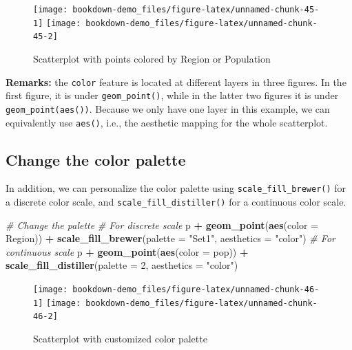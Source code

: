 \documentclass[]{book}
\newenvironment{Shaded}{\begin{snugshade}}{\end{snugshade}}
\newcommand{\KeywordTok}[1]{\textcolor[rgb]{0.13,0.29,0.53}{\textbf{#1}}}
\newcommand{\DataTypeTok}[1]{\textcolor[rgb]{0.13,0.29,0.53}{#1}}
\newcommand{\DecValTok}[1]{\textcolor[rgb]{0.00,0.00,0.81}{#1}}
\newcommand{\StringTok}[1]{\textcolor[rgb]{0.31,0.60,0.02}{#1}}
\newcommand{\CommentTok}[1]{\textcolor[rgb]{0.56,0.35,0.01}{\textit{#1}}}
\newcommand{\OperatorTok}[1]{\textcolor[rgb]{0.81,0.36,0.00}{\textbf{#1}}}
\newcommand{\NormalTok}[1]{#1}
\begin{document}
\begin{figure}
\texttt{[image: bookdown-demo\_files/figure-latex/unnamed-chunk-45-1]} \texttt{[image: bookdown-demo\_files/figure-latex/unnamed-chunk-45-2]} \caption{Scatterplot with points colored by Region or Population}\label{fig:unnamed-chunk-45}
\end{figure}

\textbf{Remarks:} the \texttt{color} feature is located at different
layers in three figures. In the first figure, it is under
\texttt{geom\_point()}, while in the latter two figures it is under
\texttt{geom\_point(aes())}. Because we only have one layer in this
example, we can equivalently use \texttt{aes()}, i.e., the aesthetic
mapping for the whole scatterplot.

\subsection{Change the color palette}\label{change-the-color-palette}

In addition, we can personalize the color palette using
\texttt{scale\_fill\_brewer()} for a discrete color scale, and
\texttt{scale\_fill\_distiller()} for a continuous color scale.

\begin{Shaded}
\begin{Highlighting}[]
\CommentTok{# Change the palette}
\CommentTok{# For discrete scale}
\NormalTok{p }\OperatorTok{+}\StringTok{ }\KeywordTok{geom_point}\NormalTok{(}\KeywordTok{aes}\NormalTok{(}\DataTypeTok{color =}\NormalTok{ Region)) }\OperatorTok{+}\StringTok{ }
\StringTok{   }\KeywordTok{scale_fill_brewer}\NormalTok{(}\DataTypeTok{palette =} \StringTok{"Set1"}\NormalTok{, }\DataTypeTok{aesthetics =} \StringTok{"color"}\NormalTok{)}
\CommentTok{# For continuous scale}
\NormalTok{p }\OperatorTok{+}\StringTok{ }\KeywordTok{geom_point}\NormalTok{(}\KeywordTok{aes}\NormalTok{(}\DataTypeTok{color =}\NormalTok{ pop)) }\OperatorTok{+}
\StringTok{ }\KeywordTok{scale_fill_distiller}\NormalTok{(}\DataTypeTok{palette =} \DecValTok{2}\NormalTok{, }\DataTypeTok{aesthetics =} \StringTok{"color"}\NormalTok{)}
\end{Highlighting}
\end{Shaded}

\begin{figure}
\texttt{[image: bookdown-demo\_files/figure-latex/unnamed-chunk-46-1]} \texttt{[image: bookdown-demo\_files/figure-latex/unnamed-chunk-46-2]} \caption{Scatterplot with customized color palette}\label{fig:unnamed-chunk-46}
\end{figure}
\end{document}
